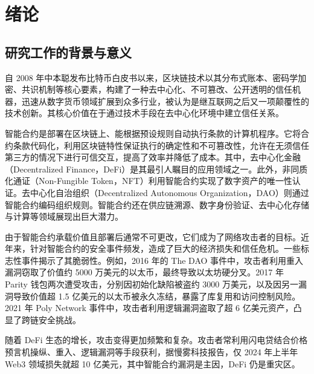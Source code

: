 \documentclass[print, master, vlined, timesmath]{DissertUESTC}
\begin{document}
\tableofcontents  

\chapter{绪论}

\section{研究工作的背景与意义}

自 2008 年中本聪发布比特币白皮书\textsuperscript{\cite{whitebook}}以来，区块链技术以其分布式账本、密码学加密、共识机制等核心要素，构建了一种去中心化、不可篡改、公开透明的信任机器，迅速从数字货币领域扩展到众多行业，被认为是继互联网之后又一项颠覆性的技术创新\textsuperscript{\cite{BlockchainRevolution_2016}}。其核心价值在于通过技术手段在去中心化环境中建立信任关系。

智能合约是部署在区块链上、能根据预设规则自动执行条款的计算机程序。它将合约条款代码化，利用区块链特性保证执行的确定性和不可篡改性，允许在无须信任第三方的情况下进行可信交互，提高了效率并降低了成本。其中，去中心化金融（Decentralized Finance，DeFi）\textsuperscript{\cite{DecentralizedFinance_2020}}是其最引人瞩目的应用领域之一。此外，非同质化通证（Non-Fungible Token，NFT）\textsuperscript{\cite{MappingNFT_2021}}利用智能合约实现了数字资产的唯一性认证。去中心化自治组织（Decentralized Autonomous Organization，DAO）则通过智能合约编码组织规则。智能合约还在供应链溯源、数字身份验证、去中心化存储与计算\textsuperscript{\cite{ComprehensiveSurvey_2023}}等领域展现出巨大潜力。

由于智能合约承载价值且部署后通常不可更改，它们成为了网络攻击者的目标。近年来，针对智能合约的安全事件频发，造成了巨大的经济损失和信任危机。一些标志性事件揭示了其脆弱性。例如，2016 年的 The DAO 事件中，攻击者利用重入漏洞\textsuperscript{\cite{sendner2024large}}窃取了价值约 5000 万美元的以太币，最终导致以太坊硬分叉\textsuperscript{\cite{Stickfork_2017}}。2017 年 Parity 钱包两次遭受攻击，分别因初始化缺陷被盗约 3000 万美元\textsuperscript{\cite{wu2024comprehensive}}，以及因另一漏洞导致价值超 1.5 亿美元的以太币被永久冻结，暴露了库复用和访问控制风险。2021 年 Poly Network 事件中，攻击者利用逻辑漏洞盗取了超 6 亿美元资产\textsuperscript{\cite{PolyNetwork}}，凸显了跨链安全挑战。

随着 DeFi 生态的增长，攻击变得更加频繁和复杂。攻击者常利用闪电贷结合价格预言机操纵、重入、逻辑漏洞等手段获利\textsuperscript{\cite{AttackingDeFi_2021a}}，据慢雾科技报告，仅 2024 年上半年 Web3 领域损失就超 10 亿美元\textsuperscript{\cite{slowmist}}，其中智能合约漏洞是主因，DeFi 仍是重灾区。
\end{document}
